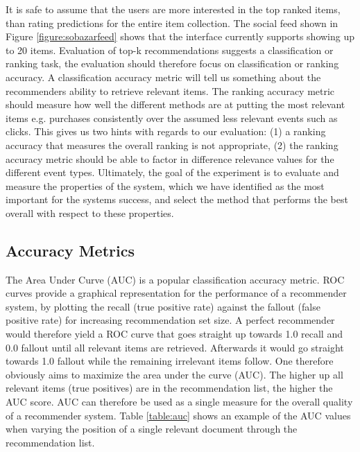 It is safe to assume that the users are more interested in the top ranked items, than rating
predictions for the entire item collection. The social feed shown in Figure \ref{figure:sobazarfeed}
shows that the interface currently supports showing up to 20 items.
Evaluation of top-k recommendations suggests a classification or ranking task, the evaluation
should therefore focus on classification or ranking accuracy. A classification accuracy metric
will tell us something about the recommenders ability to retrieve relevant items. The ranking
accuracy metric should measure how well the different methods are at putting the most relevant items
e.g. purchases consistently over the assumed less relevant events such as clicks. This gives us
two hints with regards to our evaluation: (1) a ranking accuracy that measures the overall ranking
is not appropriate, (2) the ranking accuracy metric should be able to factor in difference relevance
values for the different event types. Ultimately, the goal of the experiment is to evaluate and measure the properties
of the system, which we have identified as the most important for the systems success,
and select the method that performs the best overall with respect to these properties.

\subsection{Accuracy Metrics}

The Area Under Curve (AUC) is a popular classification accuracy metric. ROC curves provide a graphical
representation for the performance of a recommender system, by plotting the recall (true positive rate)
against the fallout (false positive rate) for increasing recommendation set size. A perfect recommender
would therefore yield a ROC curve that goes straight up towards 1.0 recall and 0.0 fallout until all
relevant items are retrieved. Afterwards it would go straight towards 1.0 fallout while the remaining
irrelevant items follow. One therefore obviously aims to maximize the area under the curve (AUC). The higher
up all relevant items (true positives) are in the recommendation list, the higher the AUC score.
AUC can therefore be used as a single measure for the overall quality of a recommender system. Table \ref{table:auc}
shows an example of the AUC values when varying the position of a single relevant document through the
recommendation list.

